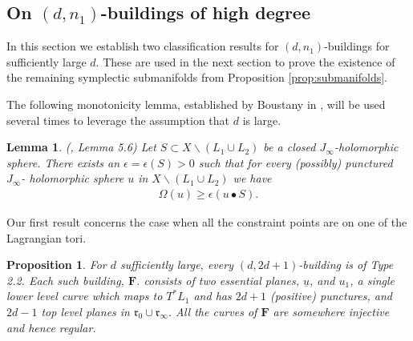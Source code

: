 \documentclass[12pt]{amsart}
\newtheorem{proposition}[theorem]{Proposition}
\newtheorem{lemma}[theorem]{Lemma}
\theoremstyle{definition}
\begin{document}


\subsection{On $(d,n_1)$-buildings of high degree}\label{sub:exist}

In this section we establish two classification results for $(d,n_1)$-buildings for sufficiently large $d$. These are used in the next section to prove the existence of the remaining symplectic submanifolds from Proposition \ref{prop:submanifolds}. 

The following monotonicity lemma, established by Boustany in \cite{boust}, will be used several times to leverage the assumption that $d$ is large. 
\begin{lemma}\label{lem:monotonicity}(\cite{boust}, Lemma 5.6)
Let $S \subset  X \smallsetminus (L_1 \cup L_2)$ be a closed $J_{\infty}$-holomorphic sphere. There exists an $\epsilon = \epsilon(S)>0$ such that for every (possibly) punctured $J_{\infty}$- holomorphic sphere $u$ in $X \smallsetminus (L_1 \cup L_2)$ we have
\begin{align}\label{lem:mon} \Omega (u) \geq \epsilon (u \bullet S).\end{align}
    
\end{lemma}


Our first result concerns the case when all the constraint points are on one of the Lagrangian tori.


\begin{proposition}\label{prop:Fd}
For $d$ sufficiently large, every $(d,2d+1)$-building is of Type 2.2. Each such building, $\mathbf{F}$. consists of two essential planes, $\underline{u}$, and $u_1$, a single lower level curve which maps to $T^*L_1$ and has $2d+1$ (positive) punctures, and $2d-1$ top level planes in $\mathfrak{r}_0 \cup \mathfrak{r}_\infty$. All the curves of $\mathbf{F}$ are somewhere injective and hence regular.
\end{proposition}
\end{document}
